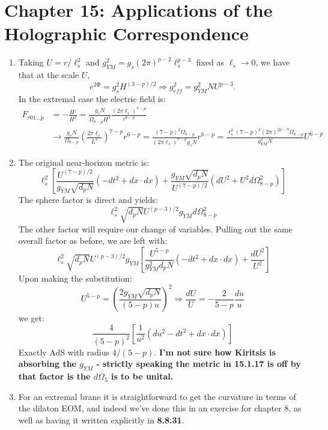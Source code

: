 \documentclass[11pt, class=article, crop=false]{standalone}
\begin{document}
\section{Chapter 15: Applications of the Holographic Correspondence} %
\label{sec:chapter_15_applications_of_the_holographic_correspondence}
\begin{enumerate}
	\item Taking $U = r/\ell_s^2$ and $g_{YM}^2 = g_s (2\pi)^{p-2} \ell_s^{p-3}$ fixed as $\ell_s \to 0$, we have that at the scale $U$,
	\[
		e^{2 \Phi} = g_s^2 H^{(3-p)/2} \Rightarrow g_{eff}^2 = g_{YM}^2 N U^{p-3}.
	\]
	In the extremal case the electric field is:
	\[
	\begin{aligned}
		F_{r01\dots p} &= - \frac{H'}{H^2} = \frac{g_s N}{\Omega_{8-p} H^2} \frac{(2\pi \ell_s)^{7-p}}{r^{8-p}}\\& \to \frac{g_s N}{\Omega_{8-p}} \left(\frac{2 \pi \ell_s}{L^2} \right)^{7-p} r^{6-p} = \frac{(7-p)^2 \Omega_{8-p}}{(2 \pi \ell_s)^{7-p} g_s N} r^{6-p} = \frac{\ell_s^2 (7-p)^2 (2\pi)^{2p - 9} \Omega_{8-p}}{g_{YM}^2 N} U^{6-p}
	\end{aligned}
	\]
	
	\item The original near-horizon metric is:
	\[
		\ell_s^2 \left[\frac{U^{(7-p)/2}}{g_{YM} \sqrt{d_p N}} (-dt^2 + dx \cdot dx) + \frac{g_{YM} \sqrt{d_p N}}{U^{(7-p)/2}} (dU^2 + U^2 d\Omega_{8-p}^2)  \right]
	\]
	The sphere factor is direct and yields:
	\[
		\ell_s^2 \sqrt{d_p N} U^{(p-3)/2} g_{YM} d\Omega_{8-p}^2
	\]
	The other factor will require our change of variables. Pulling out the same overall factor as before, we are left with:
	\[
		\ell_s^2 \sqrt{d_p N} U^{(p-3)/2} g_{YM} \left[\frac{U^{5-p}}{g_{YM}^2 d_p N} (-dt^2 + dx \cdot dx) + \frac{dU^2}{U^2} \right]
	\]
	Upon making the substitution:
	\[
		U^{5-p} = \left(\frac{2 g_{YM} \sqrt{d_p N}}{(5-p) u} \right)^2 \Rightarrow \frac{dU}{U} = - \frac{2}{5-p} \frac{du}{u}
	\]
	we get:
	\[
		\frac{4}{(5-p)^2} \left[\frac{1}{u^2} (du^2 -dt^2 + dx \cdot dx)\right]
	\]
	Exactly AdS with radius $4/(5-p)$. \textbf{I'm not sure how Kiritsis is absorbing the $g_{YM}$ - strictly speaking the metric in 15.1.17 is off by that factor is the $d\Omega_5$ is to be unital.}
	
	\item For an extremal brane it is straightforward to get the curvature in terms of the dilaton EOM, and indeed we've done this in an exercise for chapter 8, as well as having it written explicitly in \textbf{8.8.31}. 
	

\end{enumerate}
\end{document}
